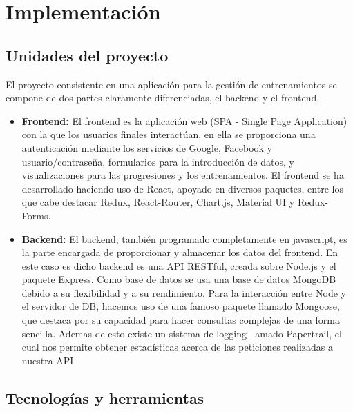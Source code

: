 \chapter{Implementación}

\section {Unidades del proyecto}
El proyecto consistente en una aplicación para la gestión de entrenamientos se compone de dos partes claramente diferenciadas, el backend y el frontend.
\begin{itemize}
  \item \textbf{Frontend:} El frontend es la aplicación web (SPA - Single Page Application) con la que los usuarios finales interactúan, en ella se proporciona una autenticación mediante los servicios de Google, Facebook y usuario/contraseña, formularios para la introducción de datos, y visualizaciones para las progresiones y los entrenamientos. El frontend se ha desarrollado haciendo uso de React, apoyado en diversos paquetes, entre los que cabe destacar Redux, React-Router, Chart.js, Material UI y Redux-Forms.
  \item \textbf{Backend:} El backend, también programado completamente en javascript, es la parte encargada de proporcionar y almacenar los datos del frontend. En este caso es dicho backend es una API RESTful, creada sobre Node.js y el paquete Express. Como base de datos se usa una base de datos MongoDB debido a su flexibilidad y a su rendimiento. Para la interacción entre Node y el servidor de DB, hacemos uso de una famoso paquete llamado Mongoose, que destaca por su capacidad para hacer consultas complejas de una forma sencilla. Ademas de esto existe un sistema de logging llamado Papertrail, el cual nos permite obtener estadísticas acerca de las peticiones realizadas a nuestra API.
\end{itemize}
\section {Tecnologías y herramientas}
